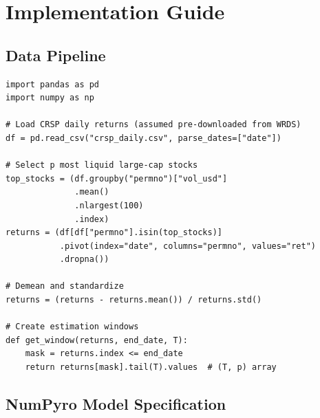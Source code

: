 \documentclass[11pt,a4paper]{article}
\begin{document}
\section{Implementation Guide}\label{sec:implementation}

\subsection{Data Pipeline}

\begin{lstlisting}[caption={Loading and preprocessing CRSP data.}]
import pandas as pd
import numpy as np

# Load CRSP daily returns (assumed pre-downloaded from WRDS)
df = pd.read_csv("crsp_daily.csv", parse_dates=["date"])

# Select p most liquid large-cap stocks
top_stocks = (df.groupby("permno")["vol_usd"]
              .mean()
              .nlargest(100)
              .index)
returns = (df[df["permno"].isin(top_stocks)]
           .pivot(index="date", columns="permno", values="ret")
           .dropna())

# Demean and standardize
returns = (returns - returns.mean()) / returns.std()

# Create estimation windows
def get_window(returns, end_date, T):
    mask = returns.index <= end_date
    return returns[mask].tail(T).values  # (T, p) array
\end{lstlisting}

\subsection{NumPyro Model Specification}
\end{document}
